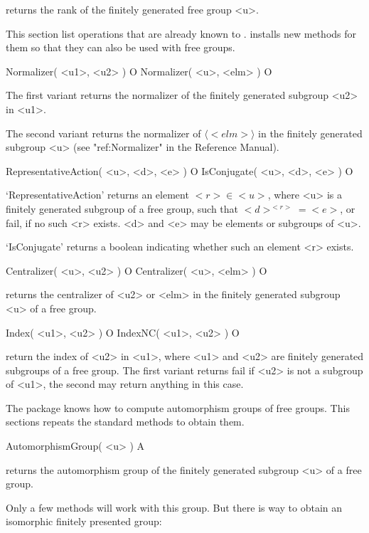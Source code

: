 returns the rank of the finitely generated free group <u>.


This section list operations that are already known to {\GAP}.
{\FGA} installs new methods for them so that they can also be used
with free groups.

\>Normalizer( <u1>, <u2> ) O
\>Normalizer( <u>, <elm> ) O

The first variant returns the normalizer of the finitely generated
subgroup <u2> in <u1>.

The second variant returns the normalizer of $\langle <elm> \rangle$
in the finitely generated subgroup <u> (see "ref:Normalizer" in the
Reference Manual).

\>RepresentativeAction( <u>, <d>, <e> ) O
\>IsConjugate( <u>, <d>, <e> ) O

`RepresentativeAction' returns an element $ <r> \in <u> $,
where <u> is a finitely generated subgroup of a free group, such
that $<d>^{<r>}=<e>$, or fail, if no such <r> exists.  <d> and <e> may
be elements or subgroups of <u>.

`IsConjugate' returns a boolean indicating whether such an element <r>
exists.

\>Centralizer( <u>, <u2> ) O
\>Centralizer( <u>, <elm> ) O

returns the centralizer of <u2> or <elm> in the finitely generated
subgroup <u> of a free group.

\>Index( <u1>, <u2> ) O
\>IndexNC( <u1>, <u2> ) O

return the index of <u2> in <u1>, where <u1> and <u2> are finitely
generated subgroups of a free group.  The first variant returns
fail if <u2> is not a subgroup of <u1>, the second may return
anything in this case.


The {\FGA} package knows how to compute automorphism groups of free
groups. This sections repeats the {\GAP} standard methods to obtain them.

\>AutomorphismGroup( <u> ) A

returns the automorphism group of the finitely generated subgroup <u>
of a free group.

Only a few methods will work with this group. But there is way to
obtain an isomorphic finitely presented group:

